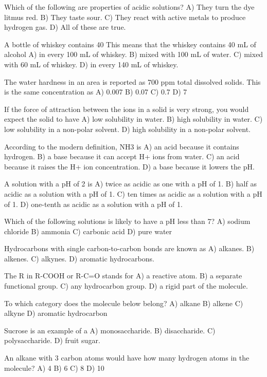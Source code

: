 Which of the following are properties of acidic solutions?
    A)  They turn the dye litmus red.
    B)  They taste sour.
    C)  They react with active metals to produce hydrogen gas.
    D)  All of these are true.

A bottle of whiskey contains 40%
This means that the whiskey contains 40 mL of alcohol
    A)  in every 100 mL of whiskey.
    B)  mixed with 100 mL of water.
    C)  mixed with 60 mL of whiskey.
    D)  in every 140 mL of whiskey.

The water hardness in an area is reported as 700 ppm total dissolved solids. This is the same concentration as
    A)  0.007%
    B)  0.07%
    C)  0.7%
    D)  7%

If the force of attraction between the ions in a solid is very strong, you would expect the solid to have
    A)  low solubility in water.
    B)  high solubility in water.
    C)  low solubility in a non-polar solvent.
    D)  high solubility in a non-polar solvent.

According to the modern definition, NH3 is
    A)  an acid because it contains hydrogen.
    B)  a base because it can accept H+ ions from water.
    C)  an acid because it raises the H+ ion concentration.
    D)  a base because it lowers the pH.

A solution with a pH of 2 is
    A)  twice as acidic as one with a pH of 1.
    B)  half as acidic as a solution with a pH of 1.
    C)  ten times as acidic as a solution with a pH of 1.
    D)  one-tenth as acidic as a solution with a pH of 1.

Which of the following solutions is likely to have a pH less than 7?
    A)  sodium chloride
    B)  ammonia
    C)  carbonic acid
    D)  pure water

Hydrocarbons with single carbon-to-carbon bonds are known as
    A)  alkanes.
    B)  alkenes.
    C)  alkynes.
    D)  aromatic hydrocarbons.

The R in R-COOH or R-C=O stands for
    A)  a reactive atom.
    B)  a separate functional group.
    C)  any hydrocarbon group.
    D)  a rigid part of the molecule.

To which category does the molecule below belong?
    A)  alkane
    B)  alkene
    C)  alkyne
    D)  aromatic hydrocarbon

Sucrose is an example of a
    A)  monosaccharide.
    B)  disaccharide.
    C)  polysaccharide.
    D)  fruit sugar.

An alkane with 3 carbon atoms would have how many hydrogen atoms in the molecule?
    A)  4
    B)  6
    C)  8
    D)  10

